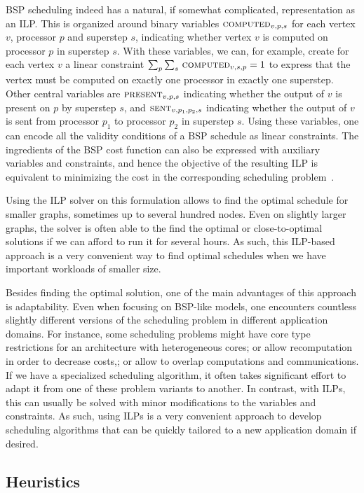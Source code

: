 \documentclass[oneside,reqno, a4paper]{amsart}
\numberwithin{equation}{section}
\begin{document}
BSP scheduling indeed has a natural, if somewhat complicated, representation as an ILP. This is organized around binary variables $\textsc{computed}_{v,p,s}$ for each vertex $v$, processor $p$ and superstep $s$, indicating whether vertex $v$ is computed on processor $p$ in superstep $s$. With these variables, we can, for example, create for each vertex $v$ a linear constraint $\sum_p \sum_s \, \textsc{computed}_{v,s,p} = 1$ to express that the vertex must be computed on exactly one processor in exactly one superstep. Other central variables are $\textsc{present}_{v,p,s}$ indicating whether the output of $v$ is present on $p$ by superstep $s$, and $\textsc{sent}_{v,p_1, p_2,s}$ indicating whether the output of $v$ is sent from processor $p_1$ to processor $p_2$ in superstep $s$. Using these variables, one can encode all the validity conditions of a BSP schedule as linear constraints. The ingredients of the BSP cost function can also be expressed with auxiliary variables and constraints, and hence the objective of the resulting ILP is equivalent to minimizing the cost in the corresponding scheduling problem~\cite{BSP_DAG_opdas,BSP_algos_opdas}.

Using the ILP solver on this formulation allows to find the optimal schedule for smaller graphs, sometimes up to several hundred nodes. Even on slightly larger graphs, the solver is often able to the find the optimal or close-to-optimal solutions if we can afford to run it for several hours. As such, this ILP-based approach is a very convenient way to find optimal schedules when we have important workloads of smaller size.

Besides finding the optimal solution, one of the main advantages of this approach is adaptability. Even when focusing on BSP-like models, one encounters countless slightly different versions of the scheduling problem in different application domains. For instance, some scheduling problems might have core type restrictions for an architecture with heterogeneous cores; or allow recomputation in order to decrease costs,; or allow to overlap computations and communications. If we have a specialized scheduling algorithm, it often takes significant effort to adapt it from one of these problem variants to another. In contrast, with ILPs, this can usually be solved with minor modifications to the variables and constraints. As such, using ILPs is a very convenient approach to develop scheduling algorithms that can be quickly tailored to a new application domain if desired.

\subsection{Heuristics}
\end{document}

